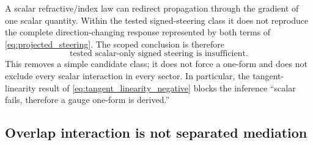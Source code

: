 \documentclass[11pt]{article}
\theoremstyle{definition}
\begin{document}
A scalar refractive/index law can redirect propagation through the gradient of one scalar quantity.  Within the tested signed-steering class it does not reproduce the complete direction-changing response represented by both terms of \cref{eq:projected_steering}.  The scoped conclusion is therefore
\begin{equation}
 \boxed{\text{tested scalar-only signed steering is insufficient}.}
 \label{eq:scalar_negative}
\end{equation}
This removes a simple candidate class; it does not force a one-form and does not exclude every scalar interaction in every sector.  In particular, the tangent-linearity result of \cref{eq:tangent_linearity_negative} blocks the inference ``scalar fails, therefore a gauge one-form is derived.''

\subsection{Overlap interaction is not separated mediation}
\end{document}
